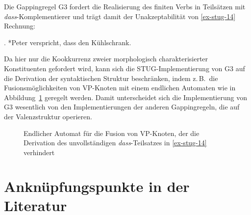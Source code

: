 
Die Gappingregel G3 fordert die Realisierung des finiten Verbs in Teilsätzen mit \emph{dass}-Kom\-ple\-mentierer und trägt damit der Unakzeptabilität von \ref{ex-stug-14} Rechnung:  

\ex. \label{ex-stug-14} *Peter verspricht, dass den Kühlschrank.

Da hier nur die Kookkurrenz zweier morphologisch charakterisierter Konstituenten gefordert wird, kann sich die STUG-Implementierung von G3 auf die Derivation der syntaktischen Struktur beschränken, indem z.\,B.\ die Fusionsmöglichkeiten von VP-Knoten mit einem endlichen Automaten wie in Abbildung~\ref{fig-stug-18} geregelt werden. Damit unterscheidet sich die Implementierung von G3 wesentlich von den Implementierungen der anderen Gappingregeln, die auf der Valenzstruktur operieren.
\begin{figure}[t]
\centering
{}
\caption{\label{fig-stug-18}Endlicher Automat für die Fusion von VP-Knoten, der die Derivation des unvollständigen \emph{dass}-Teilsatzes in \ref{ex-stug-14} verhindert}
\end{figure}



\section{Anknüpfungspunkte in der Literatur} \label{sec-stug-implikationen}


